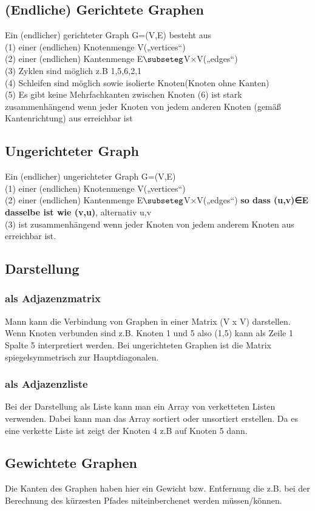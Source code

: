 \documentclass[jou,apacite]{apa6}
\begin{document}
\subsection{(Endliche) Gerichtete Graphen}
Ein (endlicher) gerichteter Graph G=(V,E) besteht aus \\
(1) einer (endlichen) Knotenmenge V(„vertices“) \\
(2) einer (endlichen) Kantenmenge E$\subseteg$V×V(„edges“) \\
(3) Zyklen sind möglich z.B 1,5,6,2,1 \\
(4) Schleifen sind möglich sowie isolierte Knoten(Knoten ohne Kanten) \\
(5) Es gibt keine Mehrfachkanten zwischen Knoten
(6) ist stark zusammenhängend wenn jeder Knoten von jedem anderen Knoten (gemäß Kantenrichtung) aus erreichbar ist
\subsection{Ungerichteter Graph}
Ein (endlicher) ungerichteter Graph G=(V,E) \\
(1) einer (endlichen) Knotenmenge V(„vertices“) \\
(2) einer (endlichen) Kantenmenge E$\subseteg$V×V(„edges“) {\bfseries so dass (u,v)∈E dasselbe ist wie (v,u)},
alternativ {u,v}\\
(3) ist zusammenhängend wenn jeder Knoten von jedem anderem Knoten aus erreichbar ist.
\subsection{Darstellung}
\subsubsection{als Adjazenzmatrix}
Mann kann die Verbindung von Graphen in einer Matrix (V x V) darstellen. Wenn Knoten verbunden sind z.B. Knoten 1 und 5 also (1,5) kann als Zeile 1 Spalte 5 interpretiert werden. Bei ungerichteten Graphen ist die Matrix spiegelsymmetrisch zur Hauptdiagonalen.
\subsubsection{als Adjazenzliste}
Bei der Darstellung als Liste kann man ein Array von verketteten Listen verwenden. Dabei kann man das Array sortiert oder unsortiert erstellen. Da es eine verkette Liste ist zeigt der Knoten 4 z.B auf Knoten 5 dann. 
\subsection{Gewichtete Graphen}
Die Kanten des Graphen haben hier ein Gewicht bzw. Entfernung die z.B. bei der Berechnung des kürzesten Pfades miteinberchenet werden müssen/können.
\end{document}
